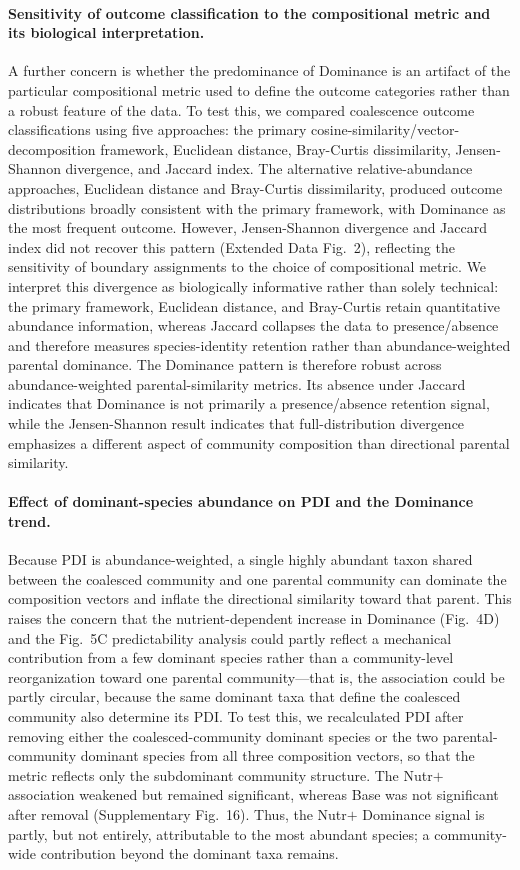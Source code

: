 \paragraph{Sensitivity of outcome classification to the compositional metric and its biological interpretation.}
A further concern is whether the predominance of Dominance is an artifact of the particular compositional metric used to define the outcome categories rather than a robust feature of the data. To test this, we compared coalescence outcome classifications using five approaches: the primary cosine-similarity/vector-decomposition framework, Euclidean distance, Bray-Curtis dissimilarity, Jensen-Shannon divergence, and Jaccard index. The alternative relative-abundance approaches, Euclidean distance and Bray-Curtis dissimilarity, produced outcome distributions broadly consistent with the primary framework, with Dominance as the most frequent outcome. However, Jensen-Shannon divergence and Jaccard index did not recover this pattern (Extended Data Fig.~2), reflecting the sensitivity of boundary assignments to the choice of compositional metric. We interpret this divergence as biologically informative rather than solely technical: the primary framework, Euclidean distance, and Bray-Curtis retain quantitative abundance information, whereas Jaccard collapses the data to presence/absence and therefore measures species-identity retention rather than abundance-weighted parental dominance. The Dominance pattern is therefore robust across abundance-weighted parental-similarity metrics. Its absence under Jaccard indicates that Dominance is not primarily a presence/absence retention signal, while the Jensen-Shannon result indicates that full-distribution divergence emphasizes a different aspect of community composition than directional parental similarity.

\paragraph{Effect of dominant-species abundance on PDI and the Dominance trend.}
Because PDI is abundance-weighted, a single highly abundant taxon shared between the coalesced community and one parental community can dominate the composition vectors and inflate the directional similarity toward that parent. This raises the concern that the nutrient-dependent increase in Dominance (Fig.~4D) and the Fig.~5C predictability analysis could partly reflect a mechanical contribution from a few dominant species rather than a community-level reorganization toward one parental community---that is, the association could be partly circular, because the same dominant taxa that define the coalesced community also determine its PDI. To test this, we recalculated PDI after removing either the coalesced-community dominant species or the two parental-community dominant species from all three composition vectors, so that the metric reflects only the subdominant community structure. The Nutr$+$ association weakened but remained significant, whereas Base was not significant after removal (Supplementary Fig.~16). Thus, the Nutr$+$ Dominance signal is partly, but not entirely, attributable to the most abundant species; a community-wide contribution beyond the dominant taxa remains.
